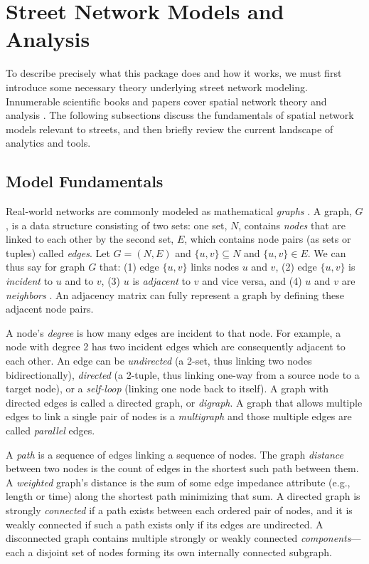 \documentclass[12pt,letterpaper]{article} %
\begin{document}
\section{Street Network Models and Analysis}

To describe precisely what this package does and how it works, we must first introduce some necessary theory underlying street network modeling. Innumerable scientific books and papers cover spatial network theory and analysis \citep[e.g.,][]{tinkler_graph_1979,barnes_graph_1983,gastner_spatial_2006,barthelemy_spatial_2011,ducruet_spatial_2014,fischer_spatial_2014,marshall_street_2018}. The following subsections discuss the fundamentals of spatial network models relevant to streets, and then briefly review the current landscape of analytics and tools.

\subsection{Model Fundamentals}

Real-world networks are commonly modeled as mathematical \textit{graphs} \citep{trudeau_introduction_1994, barthelemy_spatial_2022}. A graph, $G$, is a data structure consisting of two sets: one set, $N$, contains \textit{nodes} that are linked to each other by the second set, $E$, which contains node pairs (as sets or tuples) called \textit{edges}. Let $G = (N, E)$ and $\{u, v\} \subseteq N$ and $\{u, v\} \in E$. We can thus say for graph $G$ that: (1) edge $\{u, v\}$ links nodes $u$ and $v$, (2) edge $\{u, v\}$ is \textit{incident} to $u$ and to $v$, (3) $u$ is \textit{adjacent} to $v$ and vice versa, and (4) $u$ and $v$ are \textit{neighbors} \citep{newman_networks:_2010}. An adjacency matrix can fully represent a graph by defining these adjacent node pairs.

A node's \textit{degree} is how many edges are incident to that node. For example, a node with degree 2 has two incident edges which are consequently adjacent to each other. An edge can be \textit{undirected} (a 2-set, thus linking two nodes bidirectionally), \textit{directed} (a 2-tuple, thus linking one-way from a source node to a target node), or a \textit{self-loop} (linking one node back to itself). A graph with directed edges is called a directed graph, or \textit{digraph}. A graph that allows multiple edges to link a single pair of nodes is a \textit{multigraph} and those multiple edges are called \textit{parallel} edges.

A \textit{path} is a sequence of edges linking a sequence of nodes. The graph \textit{distance} between two nodes is the count of edges in the shortest such path between them. A \textit{weighted} graph's distance is the sum of some edge impedance attribute (e.g., length or time) along the shortest path minimizing that sum. A directed graph is strongly \textit{connected} if a path exists between each ordered pair of nodes, and it is weakly connected if such a path exists only if its edges are undirected. A disconnected graph contains multiple strongly or weakly connected \textit{components}---each a disjoint set of nodes forming its own internally connected subgraph.
\end{document}
